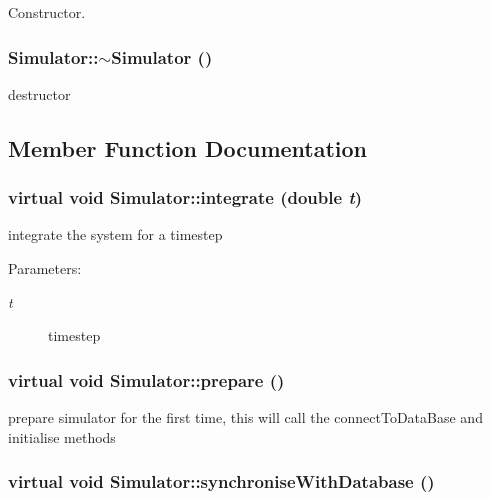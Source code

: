 Constructor. 

\subsubsection[$\sim$Simulator]{\setlength{\rightskip}{0pt plus 5cm}Simulator::$\sim$Simulator ()}\label{classSimulator_0f49aa04f42060a785adf77346b9de9f}


destructor 



\subsection{Member Function Documentation}
\subsubsection[integrate]{\setlength{\rightskip}{0pt plus 5cm}virtual void Simulator::integrate (double {\em t})\hspace{0.3cm}{\tt  [pure virtual]}}\label{classSimulator_d76c95dd87fa0cd660a6983271837082}


integrate the system for a timestep \begin{Desc}
\item[Parameters:]
\begin{description}
\item[{\em t}]timestep \end{description}
\end{Desc}
\subsubsection[prepare]{\setlength{\rightskip}{0pt plus 5cm}virtual void Simulator::prepare ()\hspace{0.3cm}{\tt  [pure virtual]}}\label{classSimulator_dd84016ae6d63ae4556225c18c473ba2}


prepare simulator for the first time, this will call the connectToDataBase and initialise methods 
\subsubsection[synchroniseWithDatabase]{\setlength{\rightskip}{0pt plus 5cm}virtual void Simulator::synchroniseWithDatabase ()\hspace{0.3cm}{\tt  [pure virtual]}}\label{classSimulator_08448abf6a7dc875cd81ec33005510a8}



